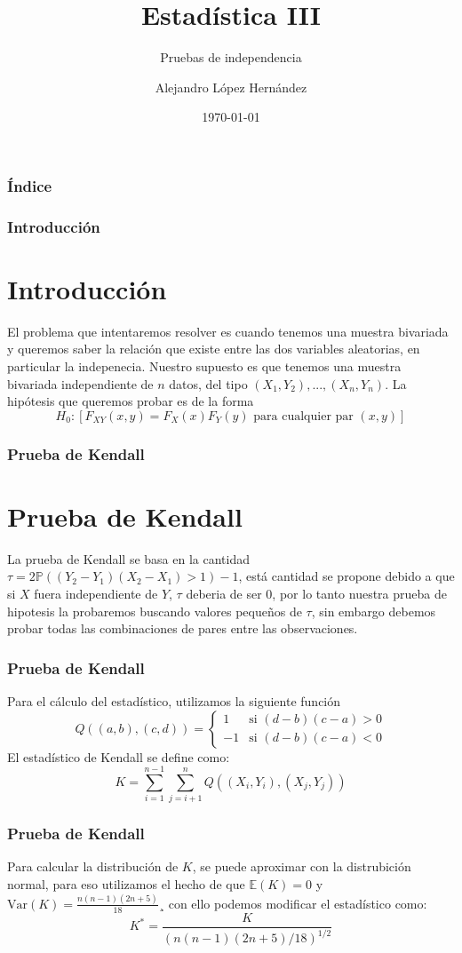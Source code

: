 \documentclass[aspectratio=169,spanish]{beamer}
\title{Estadística III}
\subtitle{Pruebas de independencia}
\author{Alejandro López Hernández}
\institute{FES Acatlán - UNAM}
\date{\today}
\begin{document}
\frame{\titlepage}



\begin{frame}
\frametitle{Índice}
\tableofcontents
\end{frame}



\begin{frame}
\frametitle{Introducción}
\section{Introducción}
El problema que intentaremos resolver es cuando tenemos una muestra bivariada y queremos saber la relación que existe entre las dos variables aleatorias, en particular la indepenecia. Nuestro supuesto es que tenemos una muestra bivariada independiente de $n$ datos, del tipo $(X_1,Y_2),...,(X_n,Y_n)$. La hipótesis que queremos probar es de la forma $$H_0:[F_{XY}(x,y)=F_{X}(x)F_{Y}(y)\text{ para cualquier par }(x,y)]$$
\end{frame}


\begin{frame}
\frametitle{Prueba de Kendall}
\section{Prueba de Kendall}
La prueba de Kendall se basa en la cantidad $\tau = 2\mathbb{P}((Y_2-Y_1)(X_2-X_1)>1)-1$, está cantidad se propone debido a que si $X$ fuera independiente de $Y$, $\tau$ deberia de ser $0$, por lo tanto nuestra prueba de hipotesis la probaremos buscando valores pequeños de $\tau$, sin embargo debemos probar todas las combinaciones de pares entre las observaciones.  
\end{frame}

\begin{frame}
\frametitle{Prueba de Kendall}
Para el cálculo del estadístico, utilizamos la siguiente función 
\begin{equation*}
Q((a,b),(c,d)) = \left\lbrace
\begin{array}{ll}
1 & \text{si } (d-b)(c-a)>0\\
-1 & \text{si } (d-b)(c-a)<0
\end{array}
\right.
\end{equation*}
El estadístico de Kendall se define como: 
$$K = \sum_{i=1}^{n-1}\sum_{j=i+1}^{n}Q((X_i,Y_i),(X_j,Y_j)) $$
\end{frame}

\begin{frame}
\frametitle{Prueba de Kendall}
Para calcular la distribución de $K$, se puede aproximar con la distrubición normal, para eso utilizamos el hecho de que $\mathbb{E}(K)=0$ y $\text{Var}(K)=\frac{n(n-1)(2n+5)}{18}$¸ con ello podemos modificar el estadístico como:
$$K^*=\frac{K}{(n(n-1)(2n+5)/18)^{1/2}}$$
\end{frame}
\end{document}
